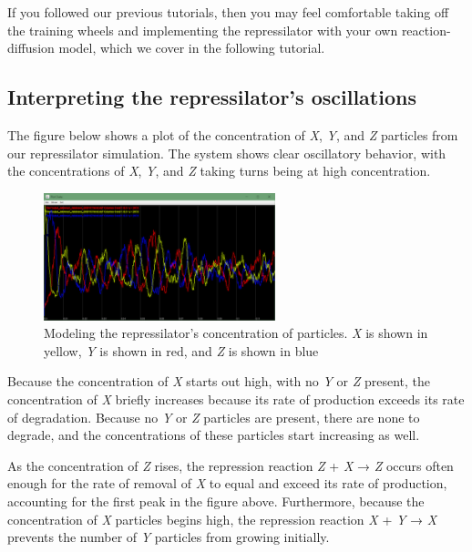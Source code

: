 If you followed our previous tutorials, then you may feel comfortable taking off the training wheels and implementing the repressilator with your own reaction-diffusion model, which we cover in the following tutorial.


\FloatBarrier
{}
\subsection{Interpreting the repressilator's oscillations}

The figure below shows a plot of the concentration of \textit{X}, \textit{Y}, and \textit{Z} particles from our repressilator simulation. The system shows clear oscillatory behavior, with the concentrations of \textit{X}, \textit{Y}, and \textit{Z} taking turns being at high concentration.

\begin{qbox}\end{qbox} 

\begin{figure}[h]
\centering
\mySfFamily
\includegraphics[width = 0.6\textwidth]{../assets/images/600px/repressilator_chart.png}
\caption{Modeling the repressilator's concentration of particles. \textit{X} is shown in yellow, \textit{Y} is shown in red, and \textit{Z} is shown in blue}
\label{fig:repressilator_chart}
\end{figure}

Because the concentration of \textit{X} starts out high, with no \textit{Y} or \textit{Z} present, the concentration of \textit{X} briefly increases because its rate of production exceeds its rate of degradation. Because no \textit{Y} or \textit{Z} particles are present, there are none to degrade, and the concentrations of these particles start increasing as well.

As the concentration of \textit{Z} rises, the repression reaction \textit{Z} + \textit{X} → \textit{Z} occurs often enough for the rate of removal of \textit{X} to equal and exceed its rate of production, accounting for the first peak in the figure above. Furthermore, because the concentration of \textit{X} particles begins high, the repression reaction \textit{X} + \textit{Y} → \textit{X} prevents the number of \textit{Y} particles from growing initially.

